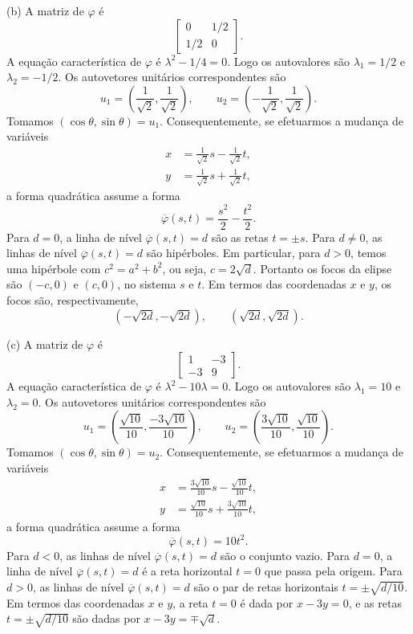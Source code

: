\documentclass[a4paper,11pt]{article}
\begin{document}
(b)
A matriz de $\varphi$ é
\[
  \begin{bmatrix}
    0 & 1/2 \\
    1/2 & 0
  \end{bmatrix}.
\]
A equação característica de $\varphi$ é $\lambda^2 - 1/4 = 0$.
Logo os autovalores são $\lambda_1 = 1/2$ e $\lambda_2 = -1/2$.
Os autovetores unitários correspondentes são
\[
  u_1 = \left( \frac{1}{\sqrt{2}}, \frac{1}{\sqrt{2}} \right), \qquad u_2 = \left( -\frac{1}{\sqrt{2}}, \frac{1}{\sqrt{2}} \right).
\]
Tomamos $(\cos \theta, \sin \theta) = u_1$.
Consequentemente, se efetuarmos a mudança de variáveis
\begin{align*}
  x & = \frac{1}{\sqrt{2}} s - \frac{1}{\sqrt{2}} t, \\
  y & = \frac{1}{\sqrt{2}} s + \frac{1}{\sqrt{2}} t,
\end{align*}
a forma quadrática assume a forma
\[
  \overline{\varphi}(s,t) = \frac{s^2}{2} - \frac{t^2}{2}.
\]
Para $d = 0$, a linha de nível $\overline{\varphi}(s,t) = d$ são as retas $t = \pm s$.
Para $d \neq 0$, as linhas de nível $\overline{\varphi}(s,t) = d$ são hipérboles.
Em particular, para $d > 0$, temos uma hipérbole com $c^2 = a^2 + b^2$, ou seja, $c = 2 \sqrt{d}$.
Portanto os focos da elipse são $(-c,0)$ e $(c,0)$, no sistema $s$ e $t$.
Em termos das coordenadas $x$ e $y$, os focos são, respectivamente,
\[
  ( -\sqrt{2d}, -\sqrt{2d}), \qquad ( \sqrt{2d}, \sqrt{2d} ).
\]

(c)
A matriz de $\varphi$ é
\[
  \begin{bmatrix}
    1 & -3 \\
    -3 & 9
  \end{bmatrix}.
\]
A equação característica de $\varphi$ é $\lambda^2 - 10\lambda = 0$.
Logo os autovalores são $\lambda_1 = 10$ e $\lambda_2 = 0$.
Os autovetores unitários correspondentes são
\[
  u_1 = \left( \frac{\sqrt{10}}{10}, \frac{-3\sqrt{10}}{10} \right), \qquad u_2 = \left( \frac{3\sqrt{10}}{10}, \frac{\sqrt{10}}{10} \right).
\]
Tomamos $(\cos \theta, \sin \theta) = u_2$.
Consequentemente, se efetuarmos a mudança de variáveis
\begin{align*}
  x & = \frac{3\sqrt{10}}{10} s - \frac{\sqrt{10}}{10} t, \\
  y & = \frac{\sqrt{10}}{10} s + \frac{3\sqrt{10}}{10} t,
\end{align*}
a forma quadrática assume a forma
\[
  \overline{\varphi}(s,t) = 10 t^2.
\]
Para $d < 0$, as linhas de nível $\overline{\varphi}(s,t) = d$ são o conjunto vazio.
Para $d = 0$, a linha de nível $\overline{\varphi}(s,t) = d$ é a reta horizontal $t = 0$ que passa pela origem.
Para $d > 0$, as linhas de nível $\overline{\varphi}(s,t) = d$ são o par de retas horizontais $t = \pm \sqrt{d/10}$.
Em termos das coordenadas $x$ e $y$, a reta $t = 0$ é dada por $x - 3y = 0$, e as retas $t = \pm \sqrt{d/10}$ são dadas por $x - 3y = \mp \sqrt{d}$.
\end{document}
